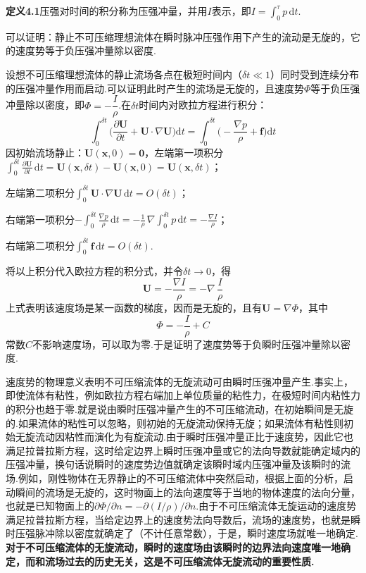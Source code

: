 \noindent\textbf{定义4.1}\quad 压强对时间的积分称为压强冲量，并用$I$表示，即$I=\displaystyle\int_0^{\tau}p\,\mathrm{d}t$.

可以证明：静止不可压缩理想流体在瞬时脉冲压强作用下产生的流动是无旋的，它的速度势等于负压强冲量除以密度.

设想不可压缩理想流体的静止流场各点在极短时间内（$\delta t\ll 1$）同时受到连续分布的压强冲量作用而启动.可以证明此时产生的流场是无旋的，且速度势$\Phi$等于负压强冲量除以密度，即$\Phi=-\dfrac{I}{\rho}$.在$\delta t$时间内对欧拉方程进行积分：
\[
\int_0^{\delta t}\Big(\frac{\partial\boldsymbol{U}}{\partial t}+\boldsymbol{U}\cdot\nabla\boldsymbol{U}\Big)\mathrm{d}t=\int_0^{\delta t}\Big(-\frac{\nabla p}{\rho}+\boldsymbol{f}\Big)\mathrm{d}t
\]
因初始流场静止：$\boldsymbol{U}(\boldsymbol{x},0)=\boldsymbol{0}$，左端第一项积分$\displaystyle\int_0^{\delta t}\frac{\partial\boldsymbol{U}}{\partial t}\,\mathrm{d}t=\boldsymbol{U}(\boldsymbol{x},\delta t)-\boldsymbol{U}(\boldsymbol{x},0)=\boldsymbol{U}(\boldsymbol{x},\delta t)$；

左端第二项积分$\displaystyle\int_0^{\delta t}\boldsymbol{U}\cdot\nabla\boldsymbol{U}\,\mathrm{d}t=O(\delta t)$；

右端第一项积分$-\displaystyle\int_0^{\delta t}\frac{\nabla p}{\rho}\,\mathrm{d}t=-\frac{1}{\rho}\,\nabla\int_0^{\delta t}p\,\mathrm{d}t=-\frac{\nabla I}{\rho}$；

右端第二项积分$\displaystyle\int_0^{\delta t}\boldsymbol{f}\,\mathrm{d}t=O(\delta t)$.

将以上积分代入欧拉方程的积分式，并令$\delta t\to 0$，得
\[
\boldsymbol{U}=-\frac{\nabla I}{\rho}=-\nabla\,\frac{I}{\rho}
\]
上式表明该速度场是某一函数的梯度，因而是无旋的，且有$\boldsymbol{U}=\nabla\Phi$，其中
\[
\Phi=-\frac{I}{\rho}+C
\]
常数$C$不影响速度场，可以取为零.于是证明了速度势等于负瞬时压强冲量除以密度.

速度势的物理意义表明不可压缩流体的无旋流动可由瞬时压强冲量产生.事实上，即使流体有粘性，例如欧拉方程右端加上单位质量的粘性力，在极短时间内粘性力的积分也趋于零.就是说由瞬时压强冲量产生的不可压缩流动，在初始瞬间是无旋的.如果流体的粘性可以忽略，则初始的无旋流动保持无旋；如果流体有粘性则初始无旋流动因粘性而演化为有旋流动.由于瞬时压强冲量正比于速度势，因此它也满足拉普拉斯方程，这时给定边界上瞬时压强冲量或它的法向导数就能确定域内的压强冲量，换句话说瞬时的速度势边值就确定该瞬时域内压强冲量及该瞬时的流场.例如，刚性物体在无界静止的不可压缩流体中突然启动，根据上面的分析，启动瞬间的流场是无旋的，这时物面上的法向速度等于当地的物体速度的法向分量，也就是已知物面上的$\partial\Phi/\partial n=-\partial(I/\rho)/\partial n$.由于不可压缩流体无旋运动的速度势满足拉普拉斯方程，当给定边界上的速度势法向导数后，流场的速度势，也就是瞬时压强脉冲除以密度就确定了（不计任意常数），于是，瞬时速度场就唯一地确定.\textbf{对于不可压缩流体的无旋流动，瞬时的速度场由该瞬时的边界法向速度唯一地确定，而和流场过去的历史无关，这是不可压缩流体无旋流动的重要性质.}


